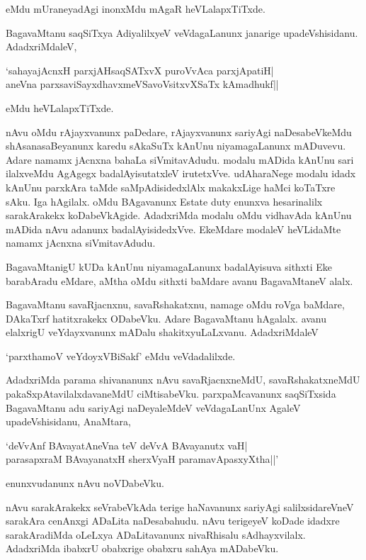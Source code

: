 \noindent eMdu mUraneyadAgi inonxMdu mAgaR heVLalapxTiTxde.

BagavaMtanu saqSiTxya AdiyalilxyeV veVdagaLanunx janarige upadeVshisidanu. AdadxriMdaleV,

\begin{shloka}
`sahayajAcnxH parxjAHsaqSATxvX puroVvAca parxjApatiH|\\
aneVna parxsaviSayxdhavxmeVSavoV\s sitxvXSaTx kAmadhukf||
\end{shloka}

\noindent eMdu heVLalapxTiTxde.

nAvu oMdu rAjayxvanunx paDedare, rAjayxvanunx sariyAgi naDesabeVkeMdu shAsanasaBeyanunx karedu sAkaSuTx kAnUnu niyamagaLanunx mADuvevu. Adare namamx jAcnxna bahaLa siVmitavAdudu. modalu mADida kAnUnu sari ilalxveMdu AgAgegx badalAyisutatxleV irutetxVve. udAharaNege modalu idadx kAnUnu parxkAra taMde saMpAdisidedxlAlx makakxLige haMci koTaTxre sAku. Iga hAgilalx. oMdu BAgavanunx {\eng Estate duty} enunxva hesarinalilx sarakArakekx koDabeVkAgide. AdadxriMda modalu oMdu vidhavAda kAnUnu mADida nAvu adanunx badalAyisidedxVve. EkeMdare modaleV heVLidaMte namamx jAcnxna siVmitavAdudu.

BagavaMtanigU kUDa kAnUnu niyamagaLanunx badalAyisuva sithxti Eke barabAradu eMdare, aMtha oMdu sithxti baMdare avanu BagavaMtaneV alalx. 

BagavaMtanu savaRjacnxnu, savaRshakatxnu, namage oMdu roVga baMdare, DAkaTxrf hatitxrakekx ODabeVku. Adare BagavaMtanu hAgalalx. avanu elalxrigU veYdayxvanunx mADalu shakitxyuLaLxvanu. AdadxriMdaleV

\begin{shloka}
`parxthamoV veYdoyxVBiSakf' eMdu veVdadalilxde.
\end{shloka}

AdadxriMda parama shivananunx nAvu savaRjacnxneMdU, savaRshakatxneMdU pakaSxpAtavilalxdavaneMdU ciMtisabeVku. parxpaMcavanunx saqSiTxsida BagavaMtanu adu sariyAgi naDeyaleMdeV veVdagaLanUnx AgaleV upadeVshisidanu, AnaMtara,

\begin{shloka}
`deVvAnf BAvayatAneVna teV deVvA BAvayanutx vaH|\\
parasapxraM BAvayanatxH sherxVyaH paramavApasxyXtha||'
\end{shloka}

\noindent enunxvudanunx nAvu noVDabeVku.

nAvu sarakArakekx seVrabeVkAda terige haNavanunx sariyAgi salilxsidareVneV sarakAra cenAnxgi ADaLita naDesabahudu. nAvu terigeyeV koDade idadxre sarakAradiMda oLeLxya ADaLitavanunx nivaRhisalu sAdhayxvilalx. AdadxriMda ibabxrU obabxrige obabxru sahAya mADabeVku.

